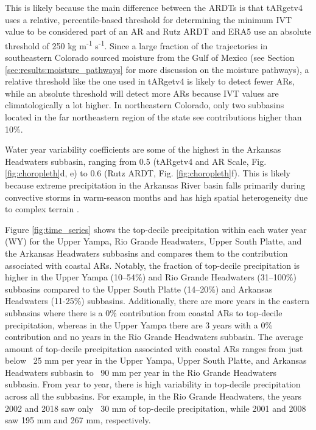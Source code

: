 \documentclass[draft]{agujournal2019}
\begin{document}
This is likely because the main difference between the ARDTs is that tARgetv4 uses a relative, percentile-based threshold for determining the minimum IVT value to be considered part of an AR and Rutz ARDT and ERA5 use an absolute threshold of 250 kg m\textsuperscript{-1} s\textsuperscript{-1}. Since a large fraction of the trajectories in southeastern Colorado sourced moisture from the Gulf of Mexico (see Section \ref{sec:results:moisture_pathways} for more discussion on the moisture pathways), a relative threshold like the one used in tARgetv4 is likely to detect fewer ARs, while an absolute threshold will detect more ARs because IVT values are climatologically a lot higher. In northeastern Colorado, only two subbasins located in the far northeastern region of the state see contributions higher than 10\%. 

Water year variability coefficients are some of the highest in the Arkansas Headwaters subbasin, ranging from 0.5 (tARgetv4 and AR Scale, Fig. \ref{fig:choropleth}d, e) to 0.6 (Rutz ARDT, Fig. \ref{fig:choropleth}f). This is likely because extreme precipitation in the Arkansas River basin falls primarily during convective storms in warm-season months and has high spatial heterogeneity due to complex terrain \cite{Javier2007ClimatologyBasin}.

Figure \ref{fig:time_series} shows the top-decile precipitation within each water year (WY) for the Upper Yampa, Rio Grande Headwaters, Upper South Platte, and the Arkansas Headwaters subbasins and compares them to the contribution associated with coastal ARs. Notably, the fraction of top-decile precipitation is higher in the Upper Yampa (10--54\%) and Rio Grande Headwaters (31--100\%) subbasins compared to the Upper South Platte (14--20\%) and Arkansas Headwaters (11-25\%) subbasins. Additionally, there are more years in the eastern subbasins where there is a 0\% contribution from coastal ARs to top-decile precipitation, whereas in the Upper Yampa there are 3 years with a 0\% contribution and no years in the Rio Grande Headwaters subbasin. The average amount of top-decile precipitation associated with coastal ARs ranges from just below ~25 mm per year in the Upper Yampa, Upper South Platte, and Arkansas Headwaters subbasin to ~90 mm per year in the Rio Grande Headwaters subbasin. From year to year, there is high variability in top-decile precipitation across all the subbasins. For example, in the Rio Grande Headwaters, the years 2002 and 2018 saw only ~30 mm of top-decile precipitation, while 2001 and 2008 saw 195 mm and 267 mm, respectively. 
\end{document}
